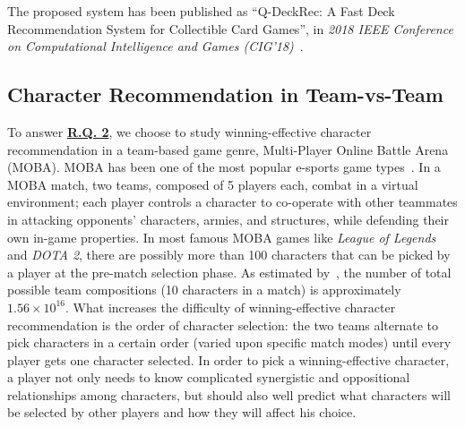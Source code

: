 The proposed system has been published as ``Q-DeckRec: A Fast Deck Recommendation System for Collectible Card Games'', in \textit{2018 IEEE Conference on Computational Intelligence and Games (CIG'18)}~\cite{chenqdeckrec}.

\subsection{Character Recommendation in Team-vs-Team}\label{sec:thesis_overview:character_recom}

To answer \hyperref[rq2]{\textbf{R.Q. 2}}, we choose to study winning-effective character recommendation in a team-based game genre, Multi-Player Online Battle Arena (MOBA). MOBA has been one of the most popular e-sports game types~\cite{superdata2016}. In a MOBA match, two teams, composed of 5 players each, combat in a virtual environment; each player controls a character to co-operate with other teammates in attacking opponents' characters, armies, and structures, while defending their own in-game properties. In most famous MOBA games like \textit{League of Legends} and \textit{DOTA 2}, there are possibly more than 100 characters that can be picked by a player at the pre-match selection phase. As estimated by~\cite{hanke2017reco}, the number of total possible team compositions (10 characters in a match) is approximately $1.56 \times 10^{16}$. What increases the difficulty of winning-effective character recommendation is the order of character selection: the two teams alternate to pick characters in a certain order (varied upon specific match modes) until every player gets one character selected. In order to pick a winning-effective character, a player not only needs to know complicated synergistic and oppositional relationships among characters, but should also well predict what characters will be selected by other players and how they will affect his choice. 

